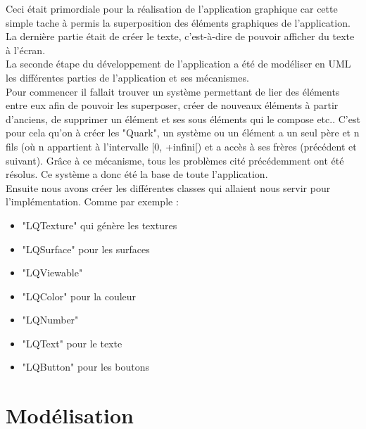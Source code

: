 \documentclass{report}
\begin{document}
Ceci était primordiale pour la réalisation de l'application graphique car cette simple tache à permis la superposition des éléments graphiques de l'application. \\
La dernière partie était de créer le texte, c'est-à-dire de pouvoir afficher du texte à l'écran. \\

La seconde étape du développement de l'application a été de modéliser en UML les différentes parties de l'application et ses mécanismes. \\
Pour commencer il fallait trouver un système permettant de lier des éléments entre eux afin de pouvoir les superposer, créer de nouveaux éléments à partir d'anciens, de supprimer un élément et ses sous éléments qui le compose etc..
C'est pour cela qu'on à créer les "Quark", un système ou un élément a un seul père et n fils (où n appartient à l'intervalle [0, +infini[) et a accès à ses frères (précédent et suivant). Grâce à ce mécanisme, tous les problèmes cité précédemment ont été résolus. Ce système a donc été la base de toute l'application. \\
Ensuite nous avons créer les différentes classes qui allaient nous servir pour l'implémentation. Comme par exemple : 
\begin{itemize}
    \item "LQTexture" qui génère les textures
    \item "LQSurface" pour les surfaces
    \item "LQViewable" 
    \item "LQColor" pour la couleur
    \item "LQNumber" 
    \item "LQText" pour le texte
    \item "LQButton" pour les boutons 
\end{itemize}

\section{Modélisation} %
\end{document}
